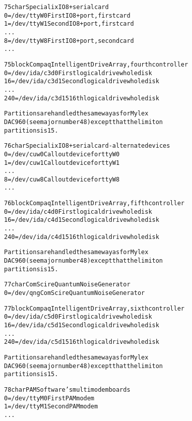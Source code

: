 \documentclass[a4paper,8pt,english]{sphinxmanual}
\begin{document}
\begin{alltt}
  75 char       Specialix IO8+ serial card
                  0 = /dev/ttyW0        First IO8+ port, first card
                  1 = /dev/ttyW1        Second IO8+ port, first card
                    ...
                  8 = /dev/ttyW8        First IO8+ port, second card
                    ...

  75 block      Compaq Intelligent Drive Array, fourth controller
                  0 = /dev/ida/c3d0     First logical drive whole disk
                 16 = /dev/ida/c3d1     Second logical drive whole disk
                    ...
                240 = /dev/ida/c3d15    16th logical drive whole disk

                Partitions are handled the same way as for Mylex
                DAC960 (see major number 48) except that the limit on
                partitions is 15.

  76 char       Specialix IO8+ serial card - alternate devices
                  0 = /dev/cuw0         Callout device for ttyW0
                  1 = /dev/cuw1         Callout device for ttyW1
                    ...
                  8 = /dev/cuw8         Callout device for ttyW8
                    ...

  76 block      Compaq Intelligent Drive Array, fifth controller
                  0 = /dev/ida/c4d0     First logical drive whole disk
                 16 = /dev/ida/c4d1     Second logical drive whole disk
                    ...
                240 = /dev/ida/c4d15    16th logical drive whole disk

                Partitions are handled the same way as for Mylex
                DAC960 (see major number 48) except that the limit on
                partitions is 15.


  77 char       ComScire Quantum Noise Generator
                  0 = /dev/qng          ComScire Quantum Noise Generator

  77 block      Compaq Intelligent Drive Array, sixth controller
                  0 = /dev/ida/c5d0     First logical drive whole disk
                 16 = /dev/ida/c5d1     Second logical drive whole disk
                    ...
                240 = /dev/ida/c5d15    16th logical drive whole disk

                Partitions are handled the same way as for Mylex
                DAC960 (see major number 48) except that the limit on
                partitions is 15.

  78 char       PAM Software's multimodem boards
                  0 = /dev/ttyM0        First PAM modem
                  1 = /dev/ttyM1        Second PAM modem
                    ...


\end{alltt}
\end{document}
